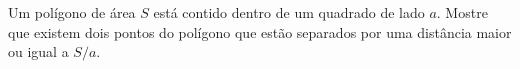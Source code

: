 Um polígono de área $S$ está contido dentro de um quadrado de lado $a$. Mostre que existem dois pontos do polígono que estão separados por uma distância maior ou igual a $S/a$.
